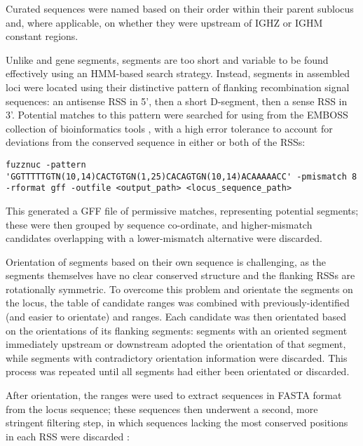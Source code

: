 Curated \jh sequences were named based on their order within their parent sublocus and, where applicable, on whether they were upstream of IGHZ or IGHM constant regions. 

\subsubsubsection{\dh}

Unlike \vh and \jh gene segments, \dh segments are too short and variable to be found effectively using an HMM-based search strategy. Instead, \dh segments in assembled loci were located using their distinctive pattern of flanking recombination signal sequences: an antisense RSS in 5', then a short D-segment, then a sense RSS in 3'. Potential matches to this pattern were searched for using  from the EMBOSS collection of bioinformatics tools \parencite{rice2000emboss}, with a high error tolerance to account for deviations from the conserved sequence in either or both of the RSSs:

\begin{lstlisting}
fuzznuc -pattern 'GGTTTTTGTN(10,14)CACTGTGN(1,25)CACAGTGN(10,14)ACAAAAACC' -pmismatch 8 -rformat gff -outfile <output_path> <locus_sequence_path>
\end{lstlisting}

This generated a GFF file \parencite{stein2010generic} of permissive matches, representing potential \dh segments; these were then grouped by sequence co-ordinate, and higher-mismatch candidates overlapping with a lower-mismatch alternative were discarded.

Orientation of \dh segments based on their own sequence is challenging, as the segments themselves have no clear conserved structure and the flanking RSSs are rotationally symmetric. To overcome this problem and orientate the \dh segments on the locus, the table of \dh candidate ranges was combined with previously-identified (and easier to orientate) \vh and \jh ranges. Each \dh candidate was then orientated based on the orientations of its flanking segments: segments with an oriented segment immediately upstream or downstream adopted the orientation of that segment, while segments with contradictory orientation information were discarded. This process was repeated until all \dh segments had either been orientated or discarded.

After orientation, the \dh ranges were used to extract \dh sequences in FASTA format from the locus sequence; these sequences then underwent a second, more stringent filtering step, in which sequences lacking the most conserved positions in each RSS were discarded \parencite{grep}:

